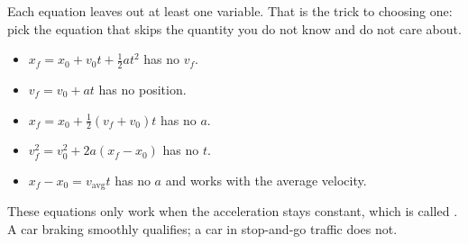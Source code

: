 Each equation leaves out at least one variable. That is the trick to choosing one: pick the equation that skips the quantity you do not know and do not care about.
\begin{itemize}
    \item $x_f = x_0 + v_0 t + \frac{1}{2}at^2$ has no $v_f$.
    \item $v_f = v_0 + at$ has no position.
    \item $x_f = x_0 + \frac{1}{2}(v_f + v_0)t$ has no $a$.
    \item $v_f^2 = v_0^2 + 2a(x_f - x_0)$ has no $t$.
    \item $x_f - x_0 = v_{\text{avg}}t$ has no $a$ and works with the average velocity.
\end{itemize}

These equations only work when the acceleration stays constant, which is called . A car braking smoothly qualifies; a car in stop-and-go traffic does not. 

